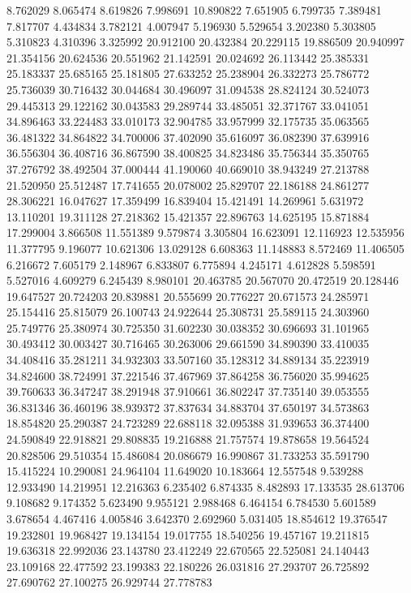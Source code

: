 8.762029
8.065474
8.619826
7.998691
10.890822
7.651905
6.799735
7.389481
7.817707
4.434834
3.782121
4.007947
5.196930
5.529654
3.202380
5.303805
5.310823
4.310396
3.325992
20.912100
20.432384
20.229115
19.886509
20.940997
21.354156
20.624536
20.551962
21.142591
20.024692
26.113442
25.385331
25.183337
25.685165
25.181805
27.633252
25.238904
26.332273
25.786772
25.736039
30.716432
30.044684
30.496097
31.094538
28.824124
30.524073
29.445313
29.122162
30.043583
29.289744
33.485051
32.371767
33.041051
34.896463
33.224483
33.010173
32.904785
33.957999
32.175735
35.063565
36.481322
34.864822
34.700006
37.402090
35.616097
36.082390
37.639916
36.556304
36.408716
36.867590
38.400825
34.823486
35.756344
35.350765
37.276792
38.492504
37.000444
41.190060
40.669010
38.943249
27.213788
21.520950
25.512487
17.741655
20.078002
25.829707
22.186188
24.861277
28.306221
16.047627
17.359499
16.839404
15.421491
14.269961
5.631972
13.110201
19.311128
27.218362
15.421357
22.896763
14.625195
15.871884
17.299004
3.866508
11.551389
9.579874
3.305804
16.623091
12.116923
12.535956
11.377795
9.196077
10.621306
13.029128
6.608363
11.148883
8.572469
11.406505
6.216672
7.605179
2.148967
6.833807
6.775894
4.245171
4.612828
5.598591
5.527016
4.609279
6.245439
8.980101
20.463785
20.567070
20.472519
20.128446
19.647527
20.724203
20.839881
20.555699
20.776227
20.671573
24.285971
25.154416
25.815079
26.100743
24.922644
25.308731
25.589115
24.303960
25.749776
25.380974
30.725350
31.602230
30.038352
30.696693
31.101965
30.493412
30.003427
30.716465
30.263006
29.661590
34.890390
33.410035
34.408416
35.281211
34.932303
33.507160
35.128312
34.889134
35.223919
34.824600
38.724991
37.221546
37.467969
37.864258
36.756020
35.994625
39.760633
36.347247
38.291948
37.910661
36.802247
37.735140
39.053555
36.831346
36.460196
38.939372
37.837634
34.883704
37.650197
34.573863
18.854820
25.290387
24.723289
22.688118
32.095388
31.939653
36.374400
24.590849
22.918821
29.808835
19.216888
21.757574
19.878658
19.564524
20.828506
29.510354
15.486084
20.086679
16.990867
31.733253
35.591790
15.415224
10.290081
24.964104
11.649020
10.183664
12.557548
9.539288
12.933490
14.219951
12.216363
6.235402
6.874335
8.482893
17.133535
28.613706
9.108682
9.174352
5.623490
9.955121
2.988468
6.464154
6.784530
5.601589
3.678654
4.467416
4.005846
3.642370
2.692960
5.031405
18.854612
19.376547
19.232801
19.968427
19.134154
19.017755
18.540256
19.457167
19.211815
19.636318
22.992036
23.143780
23.412249
22.670565
22.525081
24.140443
23.109168
22.477592
23.199383
22.180226
26.031816
27.293707
26.725892
27.690762
27.100275
26.929744
27.778783
